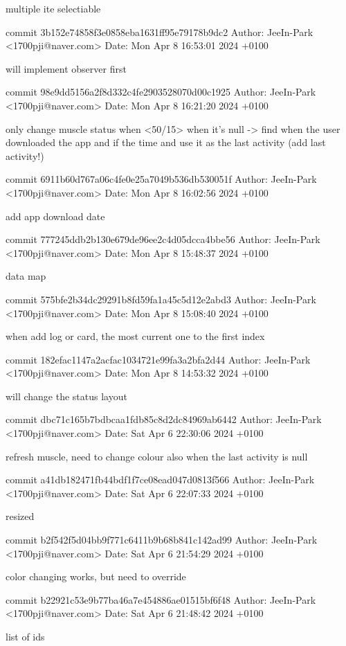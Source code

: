     multiple ite selectiable

commit 3b152e74858f3e0858eba1631ff95e79178b9dc2
Author: JeeIn-Park <1700pji@naver.com>
Date:   Mon Apr 8 16:53:01 2024 +0100

    will implement observer first

commit 98e9dd5156a2f8d332c4fe2903528070d00c1925
Author: JeeIn-Park <1700pji@naver.com>
Date:   Mon Apr 8 16:21:20 2024 +0100

    only change muscle status when <50/15>
    when it's null -> find when the user downloaded the app and if the time and use it as the last activity (add last activity!)

commit 6911b60d767a06c4fe0e25a7049b536db530051f
Author: JeeIn-Park <1700pji@naver.com>
Date:   Mon Apr 8 16:02:56 2024 +0100

    add app download date

commit 777245ddb2b130e679de96ee2c4d05dcca4bbe56
Author: JeeIn-Park <1700pji@naver.com>
Date:   Mon Apr 8 15:48:37 2024 +0100

    data map

commit 575bfe2b34dc29291b8fd59fa1a45c5d12e2abd3
Author: JeeIn-Park <1700pji@naver.com>
Date:   Mon Apr 8 15:08:40 2024 +0100

    when add log or card, the most current one to the first index

commit 182efac1147a2acfac1034721e99fa3a2bfa2d44
Author: JeeIn-Park <1700pji@naver.com>
Date:   Mon Apr 8 14:53:32 2024 +0100

    will change the status layout

commit dbc71c165b7bdbcaa1fdb85c8d2dc84969ab6442
Author: JeeIn-Park <1700pji@naver.com>
Date:   Sat Apr 6 22:30:06 2024 +0100

    refresh muscle, need to change colour also when the last activity is null

commit a41db182471fb44bdf1f7ce08ead047d0813f566
Author: JeeIn-Park <1700pji@naver.com>
Date:   Sat Apr 6 22:07:33 2024 +0100

    resized

commit b2f542f5d04bb9f771c6411b9b68b841c142ad99
Author: JeeIn-Park <1700pji@naver.com>
Date:   Sat Apr 6 21:54:29 2024 +0100

    color changing works, but need to override

commit b22921c53e9b77ba46a7e454886ae01515bf6f48
Author: JeeIn-Park <1700pji@naver.com>
Date:   Sat Apr 6 21:48:42 2024 +0100

    list of ids

